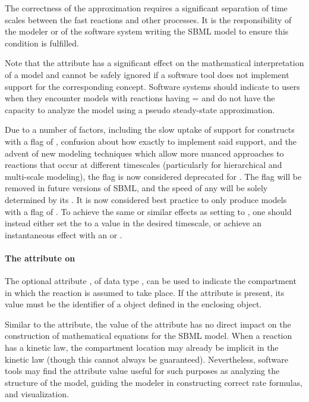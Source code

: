 The correctness of the approximation requires a significant
separation of time scales between the fast reactions and other
processes.  It is the responsibility of the modeler or of the
software system writing the SBML model to ensure this condition is
fulfilled.

Note that the  attribute has a significant effect on
the mathematical interpretation of a model and cannot be safely
ignored if a software tool does not implement support for the
corresponding concept.  Software systems should indicate to users
when they encounter models with reactions having
= and do not have the capacity to analyze
the model using a pseudo steady-state approximation.

\begin{blockChanged}
Due to a number of factors, including the slow uptake of support for \Reaction constructs with a  flag of , confusion about how exactly to implement said support, and the advent of new modeling techniques which allow more nuanced approaches to reactions that occur at different timescales (particularly for hierarchical and multi-scale modeling), the  flag is now considered deprecated for \sbmlthree.  The  flag will be removed in future versions of SBML, and the speed of any \Reaction will be solely determined by its \KineticLaw.  It is now considered best practice to only produce models with a  flag of .  To achieve the same or similar effects as setting  to , one should instead either set the \KineticLaw to a value in the desired timescale, or achieve an instantaneous effect with an \AssignmentRule or \AlgebraicRule.
\end{blockChanged}


\paragraph{The  attribute on }
\label{sec:reaction-compartment}

The optional attribute , of data type
, can be used to indicate the compartment in
which the reaction is assumed to take place.  If the attribute is
present, its value must be the identifier of a \Compartment object
defined in the enclosing \Model object.

Similar to the  attribute, the value of the
 attribute has no direct impact on the
construction of mathematical equations for the SBML model.  When a
reaction has a kinetic law, the compartment location may already
be implicit in the kinetic law (though this cannot always be
guaranteed).  Nevertheless, software tools may find the
 attribute value useful for such purposes as
analyzing the structure of the model, guiding the modeler in
constructing correct rate formulas, and visualization.


